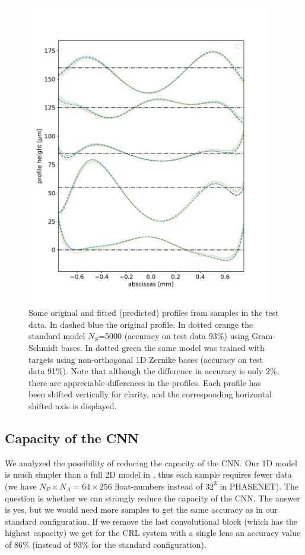 \documentclass{iucr}
\newcommand{\inred}[1]{{\color{black}#1}}
\begin{document}
\begin{figure}\label{fig:v14profiles}
    \includegraphics[width=0.95\textwidth]{figures/figure4.pdf}
    \caption{Some original and fitted (predicted) profiles from samples in the test data.
    \inred{In dashed blue the original profile. In dotted orange the standard model $N_S$=5000 (accuracy on test  data 93\%) using Gram-Schmidt bases. In dotted green the same model was trained with targets using  non-orthogonal 1D Zernike bases (accuracy on test  data 91\%). Note that although the difference in accuracy is only 2\%, there are appreciable differences in the profiles. Each profile has been shifted vertically for clarity, and the corresponding horizontal shifted axis is displayed.
    }
    }
\end{figure}

\subsection{Capacity of the CNN}
We analyzed the possibility of reducing the capacity of the CNN. Our 1D model is much simpler than a full 2D model in \cite{Saha2020}, thus each sample requires fewer data (we have $N_P\times N_A=64\times 256$ float-numbers instead of $32^3$ in PHASENET). The question is whether we can strongly reduce the capacity of the CNN. The answer is yes, but we would need more samples to get the same accuracy as in our standard configuration. If we remove the last convolutional block (which has the highest capacity) we get for the CRL system with a single lens an accuracy value of 86\% (instead of 93\% for the standard configuration).
\end{document}
